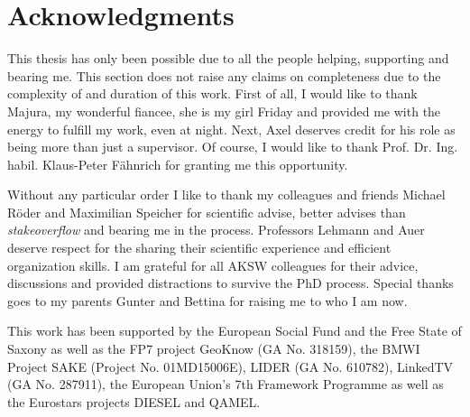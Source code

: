 



\bigskip

\begingroup
\let\clearpage\relax
\let\cleardoublepage\relax
\let\cleardoublepage\relax
\chapter*{Acknowledgments}
This thesis has only been possible due to all the people helping, supporting and bearing me.
This section does not raise any claims on completeness due to the complexity of and duration of this work.
First of all, I would like to thank Majura, my wonderful fiancee, she is my girl Friday and provided me with the energy to fulfill my work, even at night.
Next, Axel deserves credit for his role as being more than just a supervisor. 
Of course, I would like to thank Prof. Dr. Ing. habil. Klaus-Peter F\"ahnrich for granting me this opportunity.
 
\bigskip

Without any particular order I like to thank my colleagues and friends Michael Röder and Maximilian Speicher for scientific advise, better advises than \emph{stakeoverflow} and bearing me in the process. 
Professors Lehmann and Auer deserve respect for the sharing their scientific experience and efficient organization skills. 
I am grateful for all AKSW colleagues for their advice, discussions and provided distractions to survive the PhD process. 
Special thanks goes to my parents Gunter and Bettina for raising me to who I am now. 


\bigskip


This work has been supported by the European Social Fund and the Free State of Saxony as well as the FP7 project GeoKnow (GA No. 318159), the BMWI Project SAKE (Project No. 01MD15006E), LIDER (GA No. 610782), LinkedTV (GA No. 287911), the European Union's 7th Framework Programme as well as the Eurostars projects DIESEL and QAMEL.


\endgroup



